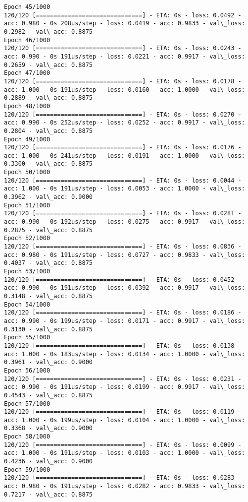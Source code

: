 \documentclass[11pt]{article}
\begin{document}
\begin{Verbatim}[commandchars=\\\{\}]
Epoch 45/1000
120/120 [==============================] - ETA: 0s - loss: 0.0492 - acc: 0.980 - 0s 208us/step - loss: 0.0419 - acc: 0.9833 - val\_loss: 0.2982 - val\_acc: 0.8875
Epoch 46/1000
120/120 [==============================] - ETA: 0s - loss: 0.0243 - acc: 0.990 - 0s 191us/step - loss: 0.0221 - acc: 0.9917 - val\_loss: 0.2659 - val\_acc: 0.8875
Epoch 47/1000
120/120 [==============================] - ETA: 0s - loss: 0.0178 - acc: 1.000 - 0s 191us/step - loss: 0.0160 - acc: 1.0000 - val\_loss: 0.2889 - val\_acc: 0.8875
Epoch 48/1000
120/120 [==============================] - ETA: 0s - loss: 0.0270 - acc: 0.990 - 0s 252us/step - loss: 0.0252 - acc: 0.9917 - val\_loss: 0.2804 - val\_acc: 0.8875
Epoch 49/1000
120/120 [==============================] - ETA: 0s - loss: 0.0176 - acc: 1.000 - 0s 241us/step - loss: 0.0191 - acc: 1.0000 - val\_loss: 0.3300 - val\_acc: 0.8875
Epoch 50/1000
120/120 [==============================] - ETA: 0s - loss: 0.0044 - acc: 1.000 - 0s 191us/step - loss: 0.0053 - acc: 1.0000 - val\_loss: 0.3962 - val\_acc: 0.9000
Epoch 51/1000
120/120 [==============================] - ETA: 0s - loss: 0.0281 - acc: 0.990 - 0s 192us/step - loss: 0.0275 - acc: 0.9917 - val\_loss: 0.2875 - val\_acc: 0.8875
Epoch 52/1000
120/120 [==============================] - ETA: 0s - loss: 0.0836 - acc: 0.980 - 0s 191us/step - loss: 0.0727 - acc: 0.9833 - val\_loss: 0.4037 - val\_acc: 0.8875
Epoch 53/1000
120/120 [==============================] - ETA: 0s - loss: 0.0452 - acc: 0.990 - 0s 191us/step - loss: 0.0392 - acc: 0.9917 - val\_loss: 0.3148 - val\_acc: 0.8875
Epoch 54/1000
120/120 [==============================] - ETA: 0s - loss: 0.0186 - acc: 0.990 - 0s 199us/step - loss: 0.0171 - acc: 0.9917 - val\_loss: 0.3130 - val\_acc: 0.8875
Epoch 55/1000
120/120 [==============================] - ETA: 0s - loss: 0.0138 - acc: 1.000 - 0s 183us/step - loss: 0.0134 - acc: 1.0000 - val\_loss: 0.3961 - val\_acc: 0.9000
Epoch 56/1000
120/120 [==============================] - ETA: 0s - loss: 0.0231 - acc: 0.990 - 0s 191us/step - loss: 0.0199 - acc: 0.9917 - val\_loss: 0.4543 - val\_acc: 0.8875
Epoch 57/1000
120/120 [==============================] - ETA: 0s - loss: 0.0119 - acc: 1.000 - 0s 199us/step - loss: 0.0104 - acc: 1.0000 - val\_loss: 0.3368 - val\_acc: 0.9000
Epoch 58/1000
120/120 [==============================] - ETA: 0s - loss: 0.0099 - acc: 1.000 - 0s 191us/step - loss: 0.0103 - acc: 1.0000 - val\_loss: 0.4236 - val\_acc: 0.9000
Epoch 59/1000
120/120 [==============================] - ETA: 0s - loss: 0.0283 - acc: 0.980 - 0s 191us/step - loss: 0.0282 - acc: 0.9833 - val\_loss: 0.7217 - val\_acc: 0.8875

\end{Verbatim}
\end{document}
